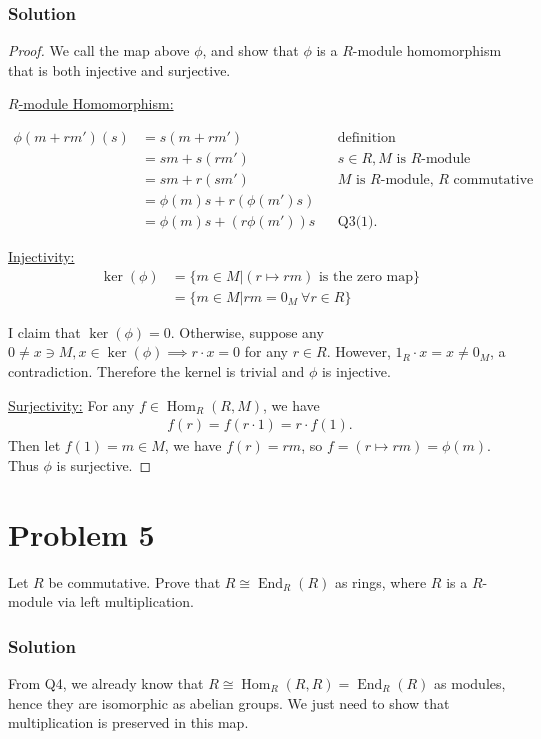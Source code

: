 \documentclass{article}
\theoremstyle{plain}
\DeclareMathOperator{\Hom}{Hom}
\DeclareMathOperator{\End}{End}
\begin{document}
\subsubsection*{Solution}
\begin{proof}
  We call the map above $\phi$, and show that $\phi$ is a $R$-module homomorphism that
  is both injective and surjective.

\underline{$R$-module Homomorphism:}

\begin{align*}
  \phi(m+rm')(s) &=s(m+rm')&&\text{definition}\\
              &=sm+s(rm')&&s\in R,\text{$M$ is $R$-module}\\
              &=sm+r(sm')&&\text{$M$ is $R$-module, $R$ commutative}\\
              &=\phi(m)s+r(\phi(m')s)\\
              &=\phi(m)s+(r\phi(m'))s&&\text{Q3(1)}.
\end{align*}

\underline{Injectivity:}
\begin{align*}
\ker(\phi)&=\{m\in M|(r\mapsto rm)\text{ is the zero map}\}\\
  &=\{m\in M|rm=0_{M}\ \forall r\in R\}
\end{align*}

I claim that $\ker(\phi)={0}$. Otherwise, suppose any
$0\ne x\ni M, x\in\ker(\phi)\implies r\cdot x=0$ for any $r\in R$. However,
$1_{R}\cdot x=x\ne 0_{M}$, a contradiction. Therefore the kernel is trivial and $\phi$ is
injective.\medskip

\underline{Surjectivity:}
For any $f\in\Hom_{R}(R,M)$, we have
\begin{align*}
f(r) = f(r\cdot1)=r\cdot f(1).
\end{align*}
Then let $f(1)=m\in M$, we have $f(r)=rm$, so $f = (r\mapsto rm)=\phi(m)$. Thus $\phi$ is surjective.
\end{proof}

\section*{Problem 5}
Let $R$ be commutative. Prove that $R\cong \End_{R}(R)$ as rings, where $R$ is a
$R$-module via left multiplication.
\subsubsection*{Solution}
From Q4, we already know that $R\cong\Hom_{R}(R,R)=\End_{R}(R)$ as modules, hence
they are isomorphic as abelian groups. We just need to show that multiplication
is preserved in this map.\medskip
\end{document}
